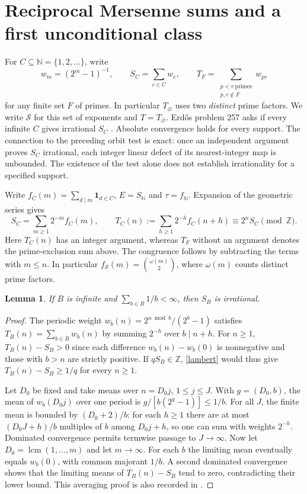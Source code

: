 \documentclass[11pt,letterpaper]{article}
\newtheorem{lemma}[theorem]{Lemma}
\newcommand{\Z}{\mathbb Z}
\newcommand{\N}{\mathbb N}
\newcommand{\ind}{\mathbf 1}
\begin{document}
\section{Reciprocal Mersenne sums and a first unconditional class}\label{sec:lambert}
For $C\subseteq\N=\{1,2,\ldots\}$, write
\[
 w_m=(2^m-1)^{-1},\qquad S_C=\sum_{c\in C}w_c,\qquad
 T_F=\sum_{\substack{p<r\ \mathrm{primes}\\p,r\notin F}}w_{pr}
\]
for any finite set $F$ of primes. In particular $T_\varnothing$ uses two
\emph{distinct} prime factors. We write $\mathcal S$ for this set of exponents and
$T=T_\varnothing$. Erd\H{o}s problem 257 asks if every infinite $C$
gives irrational $S_C$ \cite{eg}. Absolute convergence holds for every support.
The connection to the preceding orbit test is exact: once an independent
argument proves $S_C$ irrational, each integer linear defect of its
nearest-integer map is unbounded. The existence of the test alone does not
establish irrationality for a specified support.

Write $f_C(m)=\sum_{d\mid m}\ind_{d\in C}$, $E=S_{\N}$ and $\tau=f_{\N}$.
Expansion of the geometric series gives
\begin{equation}\label{lambert}
 S_C=\sum_{m\ge1}2^{-m}f_C(m),\qquad
 T_C(n):=\sum_{h\ge1}2^{-h}f_C(n+h)\equiv2^n S_C\pmod{\Z}.
\end{equation}
Here $T_C(n)$ has an integer argument, whereas $T_F$ without an
argument denotes the prime-exclusion sum above. The congruence follows
by subtracting the terms with $m\le n$. In particular
$f_{\mathcal S}(m)=\binom{\omega(m)}2$, where $\omega(m)$ counts distinct prime factors.


\begin{lemma}\label{finite}
If $B$ is infinite and $\sum_{b\in B}1/b<\infty$, then $S_B$ is irrational.
\end{lemma}
\begin{proof}
The periodic weight $w_b(n)=2^{n\bmod b}/(2^b-1)$ satisfies $T_B(n)=\sum_{b\in B}w_b(n)$ by summing $2^{-h}$ over $b\mid n+h$. For $n\ge1$, $T_B(n)-S_B>0$ since each difference $w_b(n)-w_b(0)$ is nonnegative and those with $b>n$ are strictly positive. If $qS_B\in\Z$, \eqref{lambert} would thus give $T_B(n)-S_B\ge1/q$ for every $n\ge1$.

Let $D_0$ be fixed and take means over $n=D_0j$, $1\le j\le J$. With $g=(D_0,b)$, the mean of $w_b(D_0j)$ over one period is $g/[b(2^g-1)]\le 1/b$. For all $J$, the finite mean is bounded by $(D_0+2)/b$: for each $h\ge1$ there are at most $(D_0J+h)/b$ multiples of $b$ among $D_0j+h$, so one can sum with weights $2^{-h}$. Dominated convergence permits termwise passage to $J\to\infty$. Now let $D_0=\operatorname{lcm}(1,\ldots,m)$ and let $m\to\infty$. For each $b$ the limiting mean eventually equals $w_b(0)$, with common majorant $1/b$. A second dominated convergence shows that the limiting means of $T_B(n)-S_B$ tend to zero, contradicting their lower bound. This averaging proof is also recorded in \cite{cook}.
\end{proof}
\end{document}
